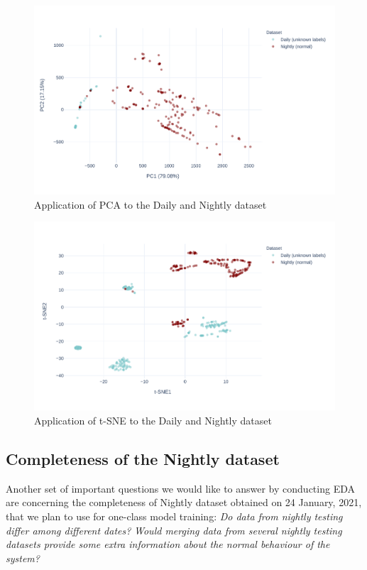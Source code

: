 \begin{figure}[h]
    \centering
    \includegraphics[width=\textwidth]{img/pca-nightly-daily.pdf}
    \caption{Application of PCA to the Daily and Nightly dataset}
    \label{fig:pca-nightly-daily}
\end{figure}

\begin{figure}[h]
    \centering
    \includegraphics[width=\textwidth]{img/tsne-nightly-daily.pdf}
    \caption{Application of t-SNE to the Daily and Nightly dataset}
    \label{fig:tsne-nightly-daily}
\end{figure}

\subsection{Completeness of the Nightly dataset}
Another set of important questions we would like to answer by conducting EDA are concerning the completeness of Nightly dataset obtained on 24 January, 2021, that we plan to use for one-class model training: \textit{Do data from nightly testing differ among different dates?} \textit{Would merging data from several nightly testing datasets provide some extra information about the normal behaviour of the system?}

